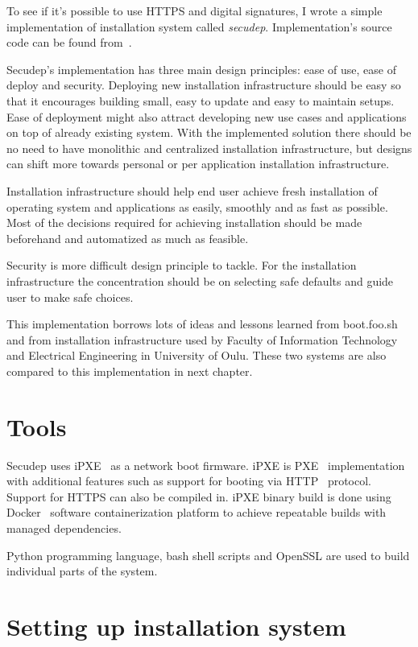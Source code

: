 
To see if it's possible to use HTTPS and digital signatures, I wrote a
simple implementation of installation system
called \emph{secudep}. Implementation's source code can be found
from~\cite{secudep}.

Secudep's implementation has three main design principles: ease of
use, ease of deploy and security. Deploying new installation
infrastructure should be easy so that it encourages building small,
easy to update and easy to maintain setups. Ease of deployment might
also attract developing new use cases and applications on top of
already existing system. With the implemented solution there should be
no need to have monolithic and centralized installation
infrastructure, but designs can shift more towards personal or per
application installation infrastructure.

Installation infrastructure should help end user achieve fresh
installation of operating system and applications as easily, smoothly
and as fast as possible. Most of the decisions required for achieving
installation should be made beforehand and automatized as much as
feasible.

Security is more difficult design principle to tackle. For the
installation infrastructure the concentration should be on selecting
safe defaults and guide user to make safe choices.

This implementation borrows lots of ideas and lessons learned from
boot.foo.sh\cite{boot-foo-sh} and from installation infrastructure
used by Faculty of Information Technology and Electrical Engineering
in University of Oulu. These two systems are also compared to this
implementation in next chapter.

\section{Tools}

Secudep uses iPXE~\cite{iPXE} as a network boot firmware. iPXE is
PXE~\cite{PXEspec} implementation with additional features such as
support for booting via HTTP~\cite{RFC2616} protocol. Support for
HTTPS can also be compiled in. iPXE binary build is done using
Docker~\cite{Docker} software containerization platform to achieve
repeatable builds with managed dependencies.

Python programming language, bash shell scripts and OpenSSL are used
to build individual parts of the system.

\section{Setting up installation system}

